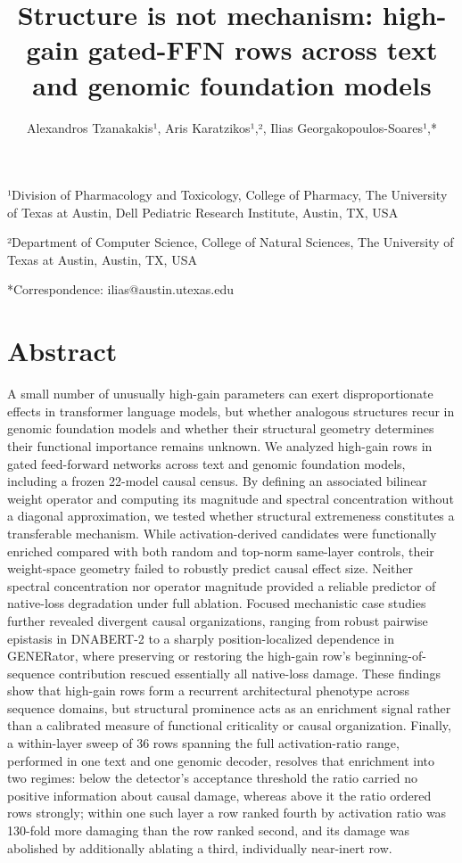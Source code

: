 \documentclass[11pt]{article}
\begin{document}
\title{Structure is not mechanism: high-gain gated-FFN rows across text and genomic foundation models}
\author{Alexandros Tzanakakis¹, Aris Karatzikos¹,², Ilias Georgakopoulos-Soares¹,*}
\date{}
\maketitle

¹Division of Pharmacology and Toxicology, College of Pharmacy, The University of Texas at Austin, Dell Pediatric Research Institute, Austin, TX, USA

²Department of Computer Science, College of Natural Sciences, The University of Texas at Austin, Austin, TX, USA

*Correspondence: ilias@austin.utexas.edu

\section*{Abstract}
A small number of unusually high-gain parameters can exert disproportionate effects in transformer language models, but whether analogous structures recur in genomic foundation models and whether their structural geometry determines their functional importance remains unknown. We analyzed high-gain rows in gated feed-forward networks across text and genomic foundation models, including a frozen 22-model causal census. By defining an associated bilinear weight operator and computing its magnitude and spectral concentration without a diagonal approximation, we tested whether structural extremeness constitutes a transferable mechanism. While activation-derived candidates were functionally enriched compared with both random and top-norm same-layer controls, their weight-space geometry failed to robustly predict causal effect size. Neither spectral concentration nor operator magnitude provided a reliable predictor of native-loss degradation under full ablation. Focused mechanistic case studies further revealed divergent causal organizations, ranging from robust pairwise epistasis in DNABERT-2 to a sharply position-localized dependence in GENERator, where preserving or restoring the high-gain row’s beginning-of-sequence contribution rescued essentially all native-loss damage.  These findings show that high-gain rows form a recurrent architectural phenotype across sequence domains, but structural prominence acts as an enrichment signal rather than a calibrated measure of functional criticality or causal organization. Finally, a within-layer sweep of 36 rows spanning the full activation-ratio range, performed in one text and one genomic decoder, resolves that enrichment into two regimes: below the detector’s acceptance threshold the ratio carried no positive information about causal damage, whereas above it the ratio ordered rows strongly; within one such layer a row ranked fourth by activation ratio was 130-fold more damaging than the row ranked second, and its damage was abolished by additionally ablating a third, individually near-inert row.
\end{document}

